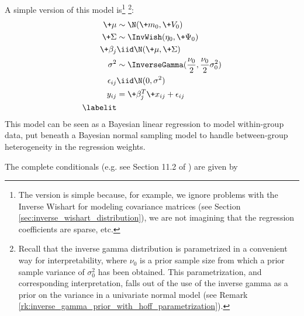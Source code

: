 \documentclass{article} %
\begin{document}
A simple version of this model is\footnote{The version is simple because,  for example,   we ignore problems with the Inverse Wishart for modeling covariance matrices (see Section \ref{sec:inverse_wishart_distribution}),  we are not imagining that the regression coefficients are sparse,  etc.} \footnote{Recall that the inverse gamma distribution is parametrized in a convenient way for interpretability,  where $\nu_0$ is a prior sample size from which a  prior sample variance of $\sigma_0^2$ has been obtained.  This parametrization,  and corresponding interpretation,  falls out of the use of the inverse gamma as a prior on the variance in a univariate normal model (see Remark \ref{rk:inverse_gamma_prior_with_hoff_parametrization}). }:
\begin{align*}
\+\mu &\sim  \N (\+m_0,\+V_0) \\
\+\Sigma &\sim \InvWish(\eta_0,  \+\Psi_0) \\
\+\beta_j &\iid \N(\+\mu,  \+\Sigma) \\
\sigma^2 &\sim \InverseGamma (\frac{\nu_0}{2}, \frac{\nu_0}{2} \sigma_0^2) \\
\epsilon_{ij} &\iid \N(0, \sigma^2) \\
y_{ij} &= \+\beta_j^T \+x_{ij} + \epsilon_{ij} \\
\labelit \label{eqn:hierarchical_linear_regression}
\end{align*}
This model can be seen as a Bayesian linear regression to model within-group data,  put beneath a Bayesian normal sampling model to handle between-group heterogeneity in the regression weights. 
 
The complete conditionals (e.g.  see Section 11.2 of \cite{hoff2009first}) are given by
\end{document}
